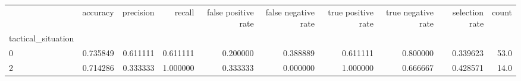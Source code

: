 \begin{tabular}{lrrrrrrrrr}
\toprule
{} &  accuracy &  precision &    recall &  false positive rate &  false negative rate &  true positive rate &  true negative rate &  selection rate &  count \\
tactical\_situation &           &            &           &                      &                      &                     &                     &                 &        \\
\midrule
0                  &  0.735849 &   0.611111 &  0.611111 &             0.200000 &             0.388889 &            0.611111 &            0.800000 &        0.339623 &   53.0 \\
2                  &  0.714286 &   0.333333 &  1.000000 &             0.333333 &             0.000000 &            1.000000 &            0.666667 &        0.428571 &   14.0 \\
\bottomrule
\end{tabular}
